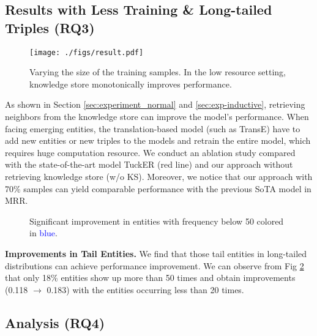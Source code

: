 \documentclass[runningheads]{llncs}
\begin{document}
\subsection{Results with  Less Training \& Long-tailed Triples (RQ3)}
\label{sec:ana-long-tail}

\begin{figure}[!htb] \centering \texttt{[image: ./figs/result.pdf]} \caption{Varying the size of the training samples. In the low resource setting, knowledge store monotonically improves performance.} 
\label{fig:incremental}
\end{figure} As shown in Section \ref{sec:experiment_normal} and \ref{sec:exp-inductive}, retrieving neighbors from the knowledge store can improve the model's performance.
When facing emerging entities, the translation-based model (such as TransE) have to add new entities or new triples to the models and retrain the entire model, which requires huge computation resource.  
We conduct an ablation study compared with the state-of-the-art model TuckER \cite{tucker} (red line) and our approach without retrieving knowledge store (w/o KS). 
Moreover, we notice that our approach with 70\% samples can yield comparable performance with the previous SoTA model in MRR.

\begin{figure}[htbp]
	\label{PAAbefore}
	\centering
		\caption{Significant improvement in entities with frequency below 50 colored in \textcolor{blue}{blue}.}
		\label{fig:long-tailed}
\end{figure}
 


\textbf{Improvements in Tail Entities.}
We find that those tail entities in long-tailed distributions can achieve performance improvement. 
We can observe from Fig \ref{fig:long-tailed} that only 18\% entities show up more than 50 times and {\ours} obtain improvements (0.118 $\rightarrow$ 0.183) with the entities occurring less than 20 times.




\subsection{Analysis (RQ4)}
\label{sec:analysis}
\end{document}
